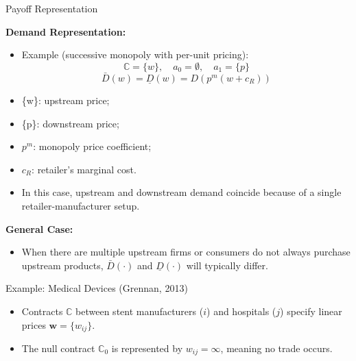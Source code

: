 \documentclass[aspectratio=169]{beamer}  %
\begin{document}
\begin{frame}{Payoff Representation}
  
    \textbf{Demand Representation:}
    \begin{itemize}
        \item Example (successive monopoly with per-unit pricing):
        \[
        \mathbb{C} = \{w\}, \quad a_0 = \emptyset, \quad a_1 = \{p\}
        \]
        \[
        \bar{D}(w) = \underline{D}(w) = D\left(p^m\left(w + c_R\right)\right)
        \]
        \item \{w\}: upstream price;
        \item \{p\}: downstream price;
        \item $p^m$: monopoly price coefficient;
        \item $c_R$: retailer's marginal cost.
        \item In this case, upstream and downstream demand coincide because of a single retailer-manufacturer setup.
    \end{itemize}

    \vspace{0.3cm}
    \textbf{General Case:}
    \begin{itemize}
        \item When there are multiple upstream firms or consumers do not always purchase upstream products, \(\bar{D}(\cdot)\) and \(\underline{D}(\cdot)\) will typically differ.
    \end{itemize}
\end{frame}

\begin{frame}{Example: Medical Devices (Grennan, 2013)}
    \begin{itemize}
        \item Contracts \(\mathbb{C}\) between stent manufacturers (\(i\)) and hospitals (\(j\)) specify linear prices \(\boldsymbol{w} = \{w_{ij}\}\).
        \item The null contract \(\mathbb{C}_0\) is represented by \(w_{ij} = \infty\), meaning no trade occurs.
    \end{itemize}
\end{frame}
\end{document}
